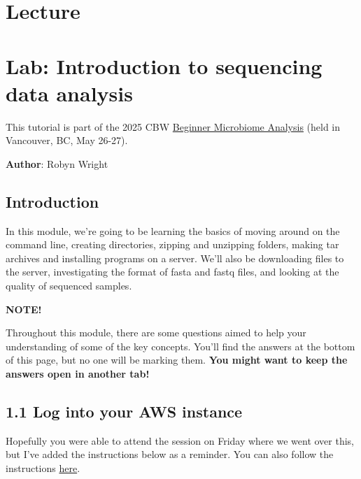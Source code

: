\documentclass[
]{book}
\newenvironment{bluebox}{
  \definecolor{shadecolor}{RGB}{172, 210, 237}
  \color{white}
  \begin{shaded}}
 {\end{shaded}}
\begin{document}
\section{Lecture}\label{lecture}

\section{Lab: Introduction to sequencing data analysis}\label{lab-introduction-to-sequencing-data-analysis}

This tutorial is part of the 2025 CBW \href{https://bioinformaticsdotca.github.io/BMB_2025/}{Beginner Microbiome Analysis} (held in Vancouver, BC, May 26-27).

\textbf{Author}: Robyn Wright

\subsection{Introduction}\label{introduction}

In this module, we're going to be learning the basics of moving around on the command line, creating directories, zipping and unzipping folders, making tar archives and installing programs on a server. We'll also be downloading files to the server, investigating the format of fasta and fastq files, and looking at the quality of sequenced samples.

\begin{bluebox}

\begin{center}
\textbf{NOTE!}

\end{center}

Throughout this module, there are some questions aimed to help your understanding of some of the key concepts. You'll find the answers at the bottom of this page, but no one will be marking them. \textbf{You might want to keep the answers open in another tab!}

\end{bluebox}

\subsection{1.1 Log into your AWS instance}\label{log-into-your-aws-instance}

Hopefully you were able to attend the session on Friday where we went over this, but I've added the instructions below as a reminder. You can also follow the instructions \href{https://github.com/bioinformaticsdotca/AWS_stuff/blob/master/Logging_into_the_Amazon_cloud.md}{here}.
\end{document}
